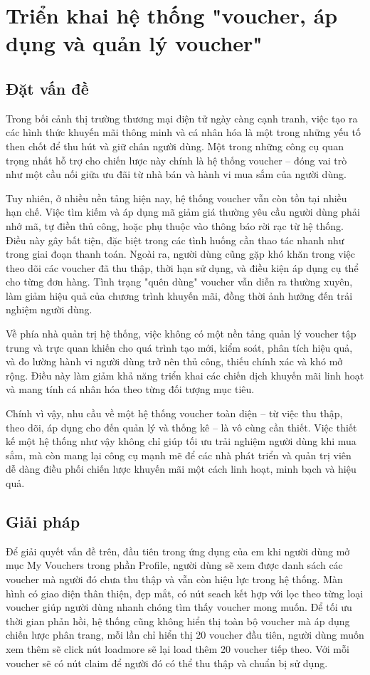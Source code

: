 \documentclass[../DoAn.tex]{subfiles}
\begin{document}
\section{Triển khai hệ thống "voucher, áp dụng và quản lý voucher"}
\subsection{Đặt vấn đề}

Trong bối cảnh thị trường thương mại điện tử ngày càng cạnh tranh, việc tạo ra các hình thức khuyến mãi thông minh và cá nhân hóa là một trong những yếu tố then chốt để thu hút và giữ chân người dùng. Một trong những công cụ quan trọng nhất hỗ trợ cho chiến lược này chính là hệ thống voucher – đóng vai trò như một cầu nối giữa ưu đãi từ nhà bán và hành vi mua sắm của người dùng.

Tuy nhiên, ở nhiều nền tảng hiện nay, hệ thống voucher vẫn còn tồn tại nhiều hạn chế. Việc tìm kiếm và áp dụng mã giảm giá thường yêu cầu người dùng phải nhớ mã, tự điền thủ công, hoặc phụ thuộc vào thông báo rời rạc từ hệ thống. Điều này gây bất tiện, đặc biệt trong các tình huống cần thao tác nhanh như trong giai đoạn thanh toán. Ngoài ra, người dùng cũng gặp khó khăn trong việc theo dõi các voucher đã thu thập, thời hạn sử dụng, và điều kiện áp dụng cụ thể cho từng đơn hàng. Tình trạng "quên dùng" voucher vẫn diễn ra thường xuyên, làm giảm hiệu quả của chương trình khuyến mãi, đồng thời ảnh hưởng đến trải nghiệm người dùng.

Về phía nhà quản trị hệ thống, việc không có một nền tảng quản lý voucher tập trung và trực quan khiến cho quá trình tạo mới, kiểm soát, phân tích hiệu quả, và đo lường hành vi người dùng trở nên thủ công, thiếu chính xác và khó mở rộng. Điều này làm giảm khả năng triển khai các chiến dịch khuyến mãi linh hoạt và mang tính cá nhân hóa theo từng đối tượng mục tiêu.

Chính vì vậy, nhu cầu về một hệ thống voucher toàn diện – từ việc thu thập, theo dõi, áp dụng cho đến quản lý và thống kê – là vô cùng cần thiết. Việc thiết kế một hệ thống như vậy không chỉ giúp tối ưu trải nghiệm người dùng khi mua sắm, mà còn mang lại công cụ mạnh mẽ để các nhà phát triển và quản trị viên dễ dàng điều phối chiến lược khuyến mãi một cách linh hoạt, minh bạch và hiệu quả.

\subsection{Giải pháp}
Để giải quyết vấn đề trên, đầu tiên trong ứng dụng của em khi người dùng mở mục My Vouchers trong phần Profile, người dùng sẽ xem được danh sách các voucher mà người đó chưa thu thập và vẫn còn hiệu lực trong hệ thống. Màn hình có giao diện thân thiện, đẹp mắt, có nút seach kết hợp với lọc theo từng loại voucher giúp người dùng nhanh chóng tìm thấy voucher mong muốn. Để tối ưu thời gian phản hồi, hệ thống cũng không hiển thị toàn bộ voucher mà áp dụng chiến lược phân trang, mỗi lần chỉ hiển thị 20 voucher đầu tiên, người dùng muốn xem thêm sẽ click nút loadmore sẽ lại load thêm 20 voucher tiếp theo. Với mỗi voucher sẽ có nút claim để người đó có thể thu thập và chuẩn bị sử dụng.
\end{document}
